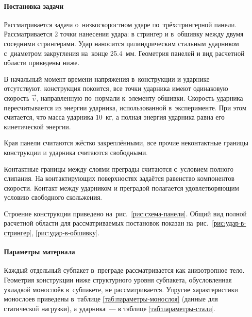\documentclass[thesis.tex]{subfiles}
\begin{document}
\paragraph{Постановка задачи}

Рассматривается задача о~низкоскоростном ударе по~трёхстрингерной панели. Рассматривается 2 точки нанесения удара: в
стрингер и в~обшивку между двумя соседними стрингерами. Удар наносится цилиндрическим стальным ударником с~диаметром
закругления на~конце 25.4~мм. Геометрия панелей и вид расчетной области приведены ниже.

В начальный момент времени напряжения в~конструкции и ударнике отсутствуют, конструкция покоится, все точки ударника
имеют одинаковую скорость $\vec v$, направленную по~нормали к~элементу обшивки. Скорость ударника пересчитывается из
энергии ударника, использованной в~эксперименте. При этом считается, что масса ударника 10~кг, а полная энергия ударника
равна его кинетической энергии.

Края панели считаются жёстко закреплёнными, все прочие неконтактные границы конструкции и ударника считаются свободными.

Контактные границы между слоями преграды считаются с~условием полного слипания. На контактирующих поверхностях задаётся
равенство компонентов скорости. Контакт между ударником и преградой полагается удовлетворяющим условию свободного
скольжения.


Строение конструкции приведено на~рис.~\ref{рис:схема-панели}. Общий вид полной расчетной
области для рассматриваемых постановок показан на~рис.~\ref{рис:удар-в-стрингер}, \ref{рис:удар-в-обшивку}.


\paragraph{Параметры материала}
\label{раздел:параметры-панели}

Каждый отдельный субпакет в~преграде рассматривается как анизотропное тело. Геометрия конструкции ниже структурного
уровня субпакета, обусловленная укладкой монослоёв в~субпакете, не рассматривается. Упругие характеристики
монослоев приведены в~таблице \ref{таб:параметры-монослоя} (данные для статической нагрузки), а ударника~---
в таблице \ref{таб:параметры-стали}.
\end{document}
